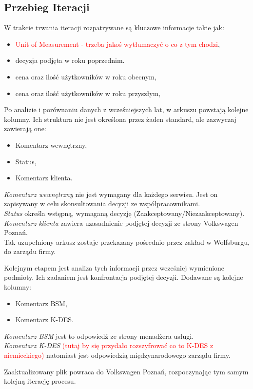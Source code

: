 \subsection{Przebieg Iteracji}
W trakcie trwania iteracji rozpatrywane są kluczowe informacje takie jak:
\begin{itemize}
\item \textcolor{red}{Unit of Measurement - trzeba jakoś wytłumaczyć o co z tym chodzi},
\item decyzja podjęta w roku poprzednim.
\item cena oraz ilość użytkowników w roku obecnym,
\item cena oraz ilość użytkowników w roku przyszłym,
\end{itemize}
Po analizie i porównaniu danych z wcześniejszych lat, w arkuszu powstają kolejne kolumny. Ich struktura nie jest określona przez żaden standard, ale zazwyczaj zawierają one:
\begin{itemize}
\item Komentarz wewnętrzny,
\item Status,
\item Komentarz klienta.
\end{itemize}

\noindent\emph{Komentarz wewnętrzny} nie jest wymagany dla każdego serwisu. Jest on zapisywany w celu skonsultowania decyzji ze współpracownikami.\\ \emph{Status} określa wstępną, wymaganą decyzję (Zaakceptowany/Niezaakceptowany).\\ \emph{Komentarz klienta} zawiera uzasadnienie podjętej decyzji ze strony Volkswagen Poznań.\\Tak uzupełniony arkusz zostaje przekazany pośrednio przez zakład w Wolfsburgu, do zarządu firmy. \par
Kolejnym etapem jest analiza tych informacji przez wcześniej wymienione podmioty. Ich zadaniem jest konfrontacja podjętej decyzji. Dodawane są kolejne kolumny:
\begin{itemize}
    \item Komentarz BSM,
    \item Komentarz K-DES.
\end{itemize}

\noindent\emph{Komentarz BSM} jest to odpowiedź ze strony menadżera usługi.\\ \emph{Komentarz K-DES} \textcolor{red}{(tutaj by się przydało rozszyfrować co to K-DES z niemieckiego)} natomiast jest odpowiedzią międzynarodowego zarządu firmy.\par
Zaaktualizowany plik powraca do Volkswagen Poznań, rozpoczynając tym samym kolejną iterację procesu.





